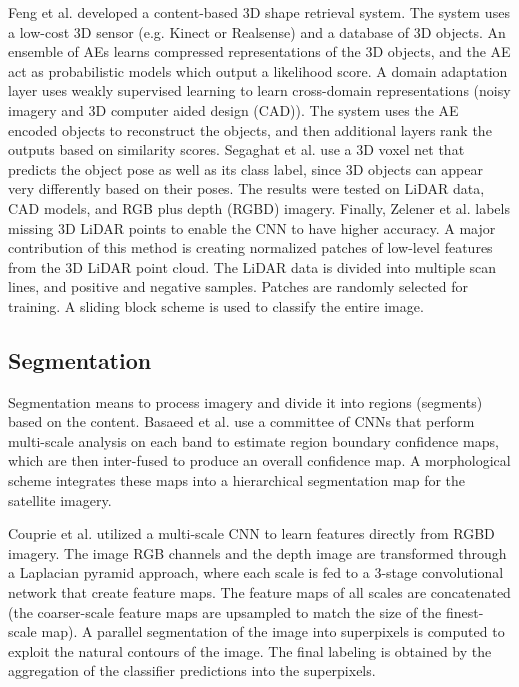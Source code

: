 \documentclass[12pt]{spieman}
\begin{document}
\begin{spacing}{1}
Feng et al. \cite{Feng2016} developed a content-based 3D shape retrieval system. The system uses a low-cost 3D sensor (e.g. Kinect or Realsense) and a database of 3D objects. An ensemble of AEs learns compressed representations of the 3D objects, and the AE act as probabilistic models which output a likelihood score. A domain adaptation layer uses weakly supervised learning to learn cross-domain representations (noisy imagery and 3D computer aided design (CAD)). The system uses the AE encoded objects to reconstruct the objects, and then additional layers rank the outputs based on similarity scores. Segaghat et al. \cite{Sedaghat2016} use a 3D voxel net that predicts the object pose as well as its class label, since 3D objects can appear very differently based on their poses. The results were tested on LiDAR data, CAD models, and RGB plus depth (RGBD) imagery. Finally, Zelener et al. \cite{zelener2016cnn} labels missing 3D LiDAR points to enable the CNN to have higher accuracy. A major contribution of this method is creating normalized patches of low-level features from the 3D LiDAR point cloud. The LiDAR data is divided into multiple scan lines, and positive and negative samples. Patches are randomly selected for training. A sliding block scheme is used to classify the entire image.

\subsection{Segmentation}
Segmentation means to process imagery and divide it into regions (segments) based on the content.
Basaeed et al. \cite{basaeed2016supervisedHierarchial} use a committee of CNNs that perform multi-scale analysis on each band to estimate region boundary confidence maps, which are then inter-fused to produce an overall confidence map. A morphological scheme integrates these maps into a hierarchical segmentation map for the satellite imagery.

Couprie et al. \cite{Couprie2013Indoor} utilized a multi-scale CNN to learn features directly from RGBD imagery. The image RGB channels and the depth image are transformed through a Laplacian pyramid approach, where each scale is fed to a 3-stage convolutional network that create feature maps. The feature maps of all scales are concatenated (the coarser-scale feature maps are upsampled to match the size of the finest-scale map). A parallel segmentation of the image into superpixels is computed to exploit the natural contours of the image. The final labeling is obtained by the aggregation of the classifier predictions into the superpixels.


\end{spacing}
\end{document}
